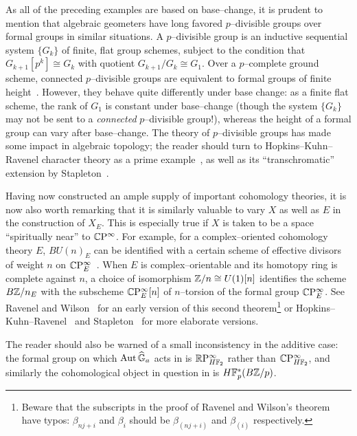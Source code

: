 \begin{remark}\label{RemarkpDivisibleGpsExist}
As all of the preceding examples are based on base--change, it is prudent to mention that algebraic geometers have long favored $p$--divisible groups over formal groups in similar situations.  A $p$--divisible group is an inductive sequential system $\{G_k\}$ of finite, flat group schemes, subject to the condition that $G_{k+1}[p^k] \cong G_k$ with quotient $G_{k+1} / G_k \cong G_1$.  Over a $p$--complete ground scheme, connected $p$--divisible groups are equivalent to formal groups of finite height~\cite[Proposition 1]{TatePDiv}.  However, they behave quite differently under base change: as a finite flat scheme, the rank of $G_1$ is constant under base--change (though the system $\{G_k\}$ may not be sent to a \emph{connected} $p$--divisible group!), whereas the height of a formal group can vary after base--change.  The theory of $p$--divisible groups has made some impact in algebraic topology; the reader should turn to Hopkins--Kuhn--Ravenel character theory as a prime example~\cite{HKR}, as well as its ``transchromatic'' extension by Stapleton~\cite{Stapleton}.
\end{remark}

\begin{remark}\label{ExamplesOfFSchFromAlgTop}
Having now constructed an ample supply of important cohomology theories, it is now also worth remarking that it is similarly valuable to vary $X$ as well as $E$ in the construction of $X_E$.  This is especially true if $X$ is taken to be a space ``spiritually near'' to $\mathbb{C}\mathrm P^\infty$.  For example, for a complex--oriented cohomology theory $E$, $BU(n)_E$ can be identified with a certain scheme of effective divisors of weight $n$ on $\mathbb{C}\mathrm P^\infty_E$~\cite[Section 8.3]{StricklandFSFG}.  When $E$ is complex--orientable and its homotopy ring is complete against $n$, a choice of isomorphism $\mathbb Z/n \cong U(1)[n]$ identifies the scheme $B\mathbb Z/n_E$ with the subscheme $\mathbb{C}\mathrm P^\infty_E[n]$ of $n$--torsion of the formal group $\mathbb{C}\mathrm P^\infty_E$.  See Ravenel and Wilson~\cite[Theorem 5.7]{RavenelWilson} for an early version of this second theorem\footnote{Beware that the subscripts in the proof of Ravenel and Wilson's theorem have typos: $\beta_{nj+i}$ and $\beta_i$ should be $\beta_{(nj+i)}$ and $\beta_{(i)}$ respectively.} or Hopkins--Kuhn--Ravenel~\cite[Section 5]{HKR} and Stapleton~\cite[Theorem 2.1 and Proposition 2.3]{Stapleton} for more elaborate versions.
\end{remark}

\begin{remark}
The reader should also be warned of a small inconsistency in the additive case: the formal group on which $\operatorname{Aut} \widehat{\mathbb G}_a$ acts in  is $\mathbb R\mathrm P^\infty_{H\mathbb F_2}$ rather than $\mathbb{C}\mathrm P^\infty_{H\mathbb F_2}$, and similarly the cohomological object in question in  is $H\mathbb F_p^*(B\mathbb Z/p)$.
\end{remark}


